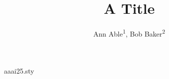 \begin{filecontents*}[overwrite]{aaai25.sty}
\def\maketitle{\par\begingroup\def\thefootnote{\fnsymbol{footnote}}\twocolumn[\@maketitle]\@thanks\endgroup
  \setcounter{footnote}{0}\let\maketitle\relax\let\@maketitle\relax\gdef\@thanks{}\let\thanks\relax}
\long\gdef\affiliations#1{\def\affiliations_{#1}}
\def\@maketitle{\newcounter{eqfn}\setcounter{eqfn}{0}\vbox{\let\footnote\thanks\relax\setcounter{footnote}{0}%
    \def\equalcontrib{\ifnum\value{eqfn}=0 \footnote{These authors contributed equally.}%
      \setcounter{eqfn}{\value{footnote}}\else\footnotemark[\value{eqfn}]\fi}%
    \hsize\textwidth\centering{\LARGE\bf\@title\par}{\Large\bf\@author\par}{\normalsize\affiliations_\par}}}
\end{filecontents*}
\documentclass{article}
\usepackage{aaai25}
\title{A Title}
\author{Ann Able\textsuperscript{\rm 1}\equalcontrib, Bob Baker\textsuperscript{\rm 2}\equalcontrib}
\affiliations{\textsuperscript{\rm 1}Univ A\thanks{Work done at Univ A.}\\ \textsuperscript{\rm 2}Univ B\equalcontrib}

\maketitle
Body.

